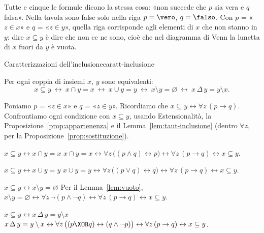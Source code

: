 \begin{spiegazione}
    Tutte e cinque le formule dicono la stessa cosa: «non succede che $p$ sia vera e $q$ falsa». Nella tavola sono false solo nella riga $p = \vero$, $q = \falso$.
    Con $p$ = «$z \in x$» e $q$ = «$z \in y$», quella riga corrisponde agli elementi di $x$ che non stanno in $y$: dire $x \subseteq y$ è dire che non ce ne sono,
    cioè che nel diagramma di Venn la lunetta di $x$ fuori da $y$ è vuota.
\end{spiegazione}


\begin{concetto}
\begin{Proposizione}{Caratterizzazioni dell'inclusione}{caratt-inclusione}
    \begin{prerequisiti}
    \end{prerequisiti}
    Per ogni coppia di insiemi $x$, $y$ sono equivalenti:
    \[ x \subseteq y \ \leftrightarrow\ x \cap y = x \ \leftrightarrow\ x \cup y = y \ \leftrightarrow\ x \setminus y = \varnothing \ \leftrightarrow\ x \,\Delta\, y = y \setminus x. \]
\end{Proposizione}
\begin{dimostrazione}
    Poniamo $p$ = «$z \in x$» e $q$ = «$z \in y$». Ricordiamo che $x \subseteq y \leftrightarrow \forall z\,(p \rightarrow q)$.
    Confrontiamo ogni condizione con $x \subseteq y$, usando Estensionalità, la Proposizione~\ref{prop:appartenenza}
    e il Lemma~\ref{lem:taut-inclusione} (dentro $\forall z$, per la Proposizione~\ref{prop:sostituzione}).
    \begin{caso}{$x \subseteq y \leftrightarrow x \cap y = x$}
        $x \cap y = x \leftrightarrow \forall z\,\big((p \wedge q) \leftrightarrow p\big) \leftrightarrow \forall z\,(p \rightarrow q) \leftrightarrow x \subseteq y$.
    \end{caso}
    \begin{caso}{$x \subseteq y \leftrightarrow x \cup y = y$}
        $x \cup y = y \leftrightarrow \forall z\,\big((p \vee q) \leftrightarrow q\big) \leftrightarrow \forall z\,(p \rightarrow q) \leftrightarrow x \subseteq y$.
    \end{caso}
    \begin{caso}{$x \subseteq y \leftrightarrow x \setminus y = \varnothing$}
        Per il Lemma~\ref{lem:vuoto},
        $x \setminus y = \varnothing \leftrightarrow \forall z\,\neg(p \wedge \neg q) \leftrightarrow \forall z\,(p \rightarrow q) \leftrightarrow x \subseteq y$.
    \end{caso}
    \begin{caso}{$x \subseteq y \leftrightarrow x \,\Delta\, y = y \setminus x$}
        $x \,\Delta\, y = y \setminus x \leftrightarrow \forall z\,\big((p \XOR q) \leftrightarrow (q \wedge \neg p)\big) \leftrightarrow \forall z\,(p \rightarrow q) \leftrightarrow x \subseteq y$.
    \end{caso}
\end{dimostrazione}
\end{concetto}


